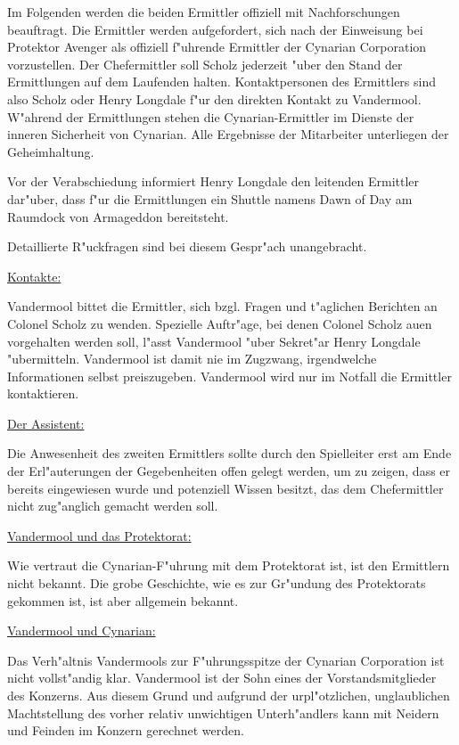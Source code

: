 Im Folgenden werden die beiden Ermittler offiziell mit Nachforschungen beauftragt. Die Ermittler werden aufgefordert, sich nach der Einweisung bei Protektor Avenger als offiziell f"uhrende Ermittler der Cynarian Corporation vorzustellen. Der Chefermittler soll Scholz jederzeit "uber den Stand der Ermittlungen auf dem Laufenden halten. Kontaktpersonen des Ermittlers sind also Scholz oder Henry Longdale f"ur den direkten Kontakt zu Vandermool. W"ahrend der Ermittlungen stehen die Cynarian-Ermittler im Dienste der inneren Sicherheit von Cynarian. Alle Ergebnisse der Mitarbeiter unterliegen der Geheimhaltung.

Vor der Verabschiedung informiert Henry Longdale den leitenden Ermittler dar"uber, dass f"ur die Ermittlungen ein Shuttle namens Dawn of Day am Raumdock von Armageddon bereitsteht.


\begin{remarks}	
	Detaillierte R"uckfragen sind bei diesem Gespr"ach unangebracht. 
	
	\underline{Kontakte:}

	Vandermool bittet die Ermittler, sich bzgl. Fragen und t"aglichen Berichten an Colonel Scholz zu wenden. Spezielle Auftr"age, bei denen Colonel Scholz au\3en vorgehalten werden soll, l"asst Vandermool "uber Sekret"ar Henry Longdale "ubermitteln. Vandermool ist damit nie im Zugzwang, irgendwelche Informationen selbst preiszugeben. Vandermool wird nur im Notfall die Ermittler kontaktieren.

	\underline{Der Assistent:}

	Die Anwesenheit des zweiten Ermittlers sollte durch den Spielleiter erst am Ende der Erl"auterungen der Gegebenheiten offen gelegt werden, um zu zeigen, dass er bereits eingewiesen wurde und potenziell Wissen besitzt, das dem Chefermittler nicht zug"anglich gemacht werden soll.

	\underline{Vandermool und das Protektorat:}

	Wie vertraut die Cynarian-F"uhrung mit dem Protektorat ist, ist den Ermittlern nicht bekannt. Die grobe Geschichte, wie es zur Gr"undung des Protektorats gekommen ist, ist aber allgemein bekannt.

	\underline{Vandermool und Cynarian:}

	Das Verh"altnis Vandermools zur F"uhrungsspitze der Cynarian Corporation ist nicht vollst"andig klar. Vandermool ist der Sohn eines der Vorstandsmitglieder des Konzerns. Aus diesem Grund und aufgrund der urpl"otzlichen, unglaublichen Machtstellung des vorher relativ unwichtigen Unterh"andlers kann mit Neidern und Feinden im Konzern gerechnet werden.
\end{remarks}

